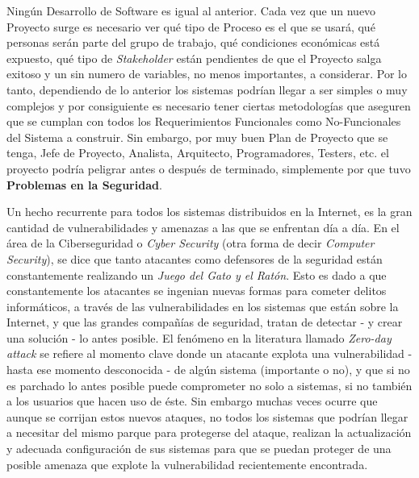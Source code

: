 Ningún Desarrollo de Software es igual al anterior. Cada vez que un nuevo Proyecto surge es necesario ver qué tipo de Proceso es el que se usará, qué personas serán parte del grupo de trabajo, qué condiciones económicas está expuesto, qué tipo de \textit{Stakeholder} están pendientes de que el Proyecto salga exitoso y un sin numero de variables, no menos importantes, a considerar. Por lo tanto, dependiendo de lo anterior los sistemas podrían llegar a ser simples o muy complejos y por consiguiente es necesario tener ciertas metodologías que aseguren que se cumplan con todos los Requerimientos Funcionales como No-Funcionales del Sistema a construir. Sin embargo, por muy buen Plan de Proyecto que se tenga, Jefe de Proyecto, Analista, Arquitecto, Programadores, Testers, etc. el proyecto podría peligrar antes o después de terminado, simplemente por que tuvo \textbf{Problemas en la Seguridad}.

Un hecho recurrente para todos los sistemas distribuidos en la Internet, es la gran cantidad de vulnerabilidades y amenazas a las que se enfrentan día a día. En el área de la Ciberseguridad o \textit{Cyber Security} (otra forma de decir \textit{Computer Security}), se dice que tanto atacantes como defensores de la seguridad están constantemente realizando un \textit{Juego del Gato y el Ratón}. Esto es dado a que constantemente los atacantes se ingenian nuevas formas para cometer delitos informáticos, a través de las vulnerabilidades en los sistemas que están sobre la Internet, y que las grandes compañías de seguridad, tratan de detectar - y crear una solución - lo antes posible. El fenómeno en la literatura llamado \textit{Zero-day attack} se refiere al momento clave donde un atacante explota una vulnerabilidad - hasta ese momento desconocida - de algún sistema (importante o no), y que si no es parchado lo antes posible puede comprometer no solo a sistemas, si no también a los usuarios que hacen uso de éste. Sin embargo muchas veces ocurre que aunque se corrijan estos nuevos ataques, no todos los sistemas que podrían llegar a necesitar del mismo parque para protegerse del ataque, realizan la actualización y adecuada configuración de sus sistemas para que se puedan proteger de una posible amenaza que explote la vulnerabilidad recientemente encontrada.

